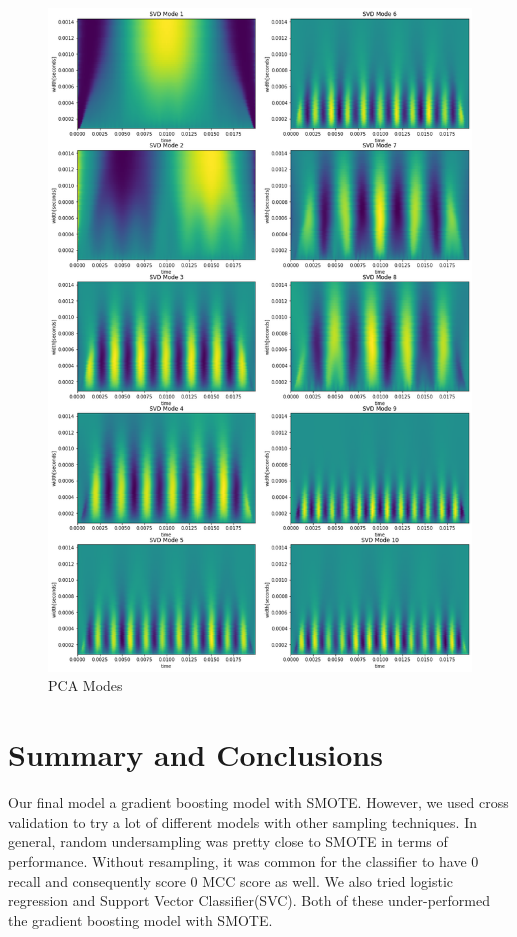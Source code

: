\documentclass{article}
\begin{document}
\begin{figure}
    \centering
    \includegraphics[width=0.8\linewidth]{pca_modes.png}
    \caption{PCA Modes}
    \label{fig:modes}
\end{figure}

\section{Summary and Conclusions}
Our final model a gradient boosting model with SMOTE. However, we used cross
validation to try a lot of different models with other sampling techniques.
In general, random undersampling was pretty close to SMOTE in terms of
performance. Without resampling, it was common for the classifier to have 0
recall and consequently score 0 MCC score as well. We also tried logistic
regression and Support Vector Classifier(SVC). Both of these under-performed the
gradient boosting model with SMOTE.
\end{document}
